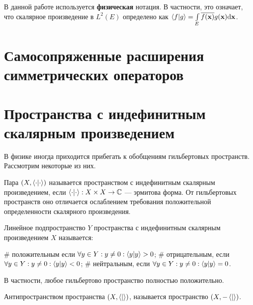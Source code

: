 В данной работе используется \textbf{физическая} нотация. В частности, это означает, что скалярное произведение в $L^2(E)$ определено как $\ip{f}{g} = \int\limits_E \cconj{f(\vb{x})} g(\vb{x}) \dd \vb{x}$.


\section{Самосопряженные расширения симметрических операторов}


\section{Пространства с индефинитным скалярным произведением}
В физике иногда приходится прибегать к обобщениям гильбертовых пространств. Рассмотрим некоторые из них.


Пара $(X, \ipcdot)$ называется пространством с индефинитным скалярным произведением, если $\ipcdot: X \times X \to \bbC$ — эрмитова форма. От гильбертовых пространств оно отличается ослаблением требования положительной определенности скалярного произведения.

Линейное подпространство $Y$ пространства с индефинитным скалярным произведением $X$ называется:
\begin{ilist}
# положительным если $\forall y \in Y: y \ne 0: \ip{y}{y} > 0$;
# отрицательным, если $\forall y \in Y: y \ne 0: \ip{y}{y} < 0$;
# нейтральным, если $\forall y \in Y: y \ne 0: \ip{y}{y} = 0$.
\end{ilist}
В частности, любое гильбертово пространство полностью положительно.

Антипространством пространства $(X, \ip{}{})$, называется пространство $(X, -\ip{}{})$.

